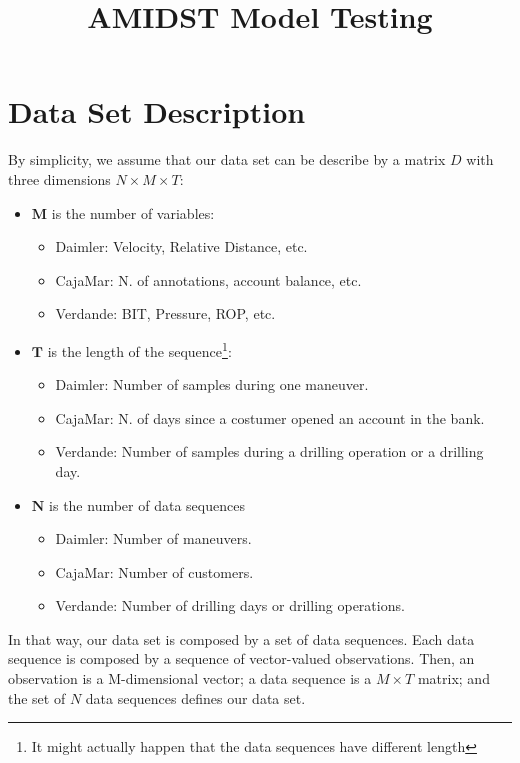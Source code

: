 \documentclass[12pt,a4paper,twopages]{article}
\title{AMIDST Model Testing}
\begin{document}
\maketitle

\section{Data Set Description}

By simplicity, we assume that our data set can be describe by a matrix $D$ with three dimensions $N\times M\times T$:

\begin{itemize}
\item $\mathbf{M}$ is the number of variables:
\begin{itemize}
\item Daimler: Velocity, Relative Distance, etc.
\item CajaMar: N. of annotations, account balance, etc.
\item Verdande: BIT, Pressure, ROP, etc.
\end{itemize}

\item $\mathbf{T}$ is the length of the sequence\footnote{It might actually happen that the data sequences have different length}:
\begin{itemize}
\item Daimler: Number of samples during one maneuver.
\item CajaMar: N. of days since a costumer opened an account in the bank. 
\item Verdande: Number of samples during a drilling operation or a drilling day.
\end{itemize}

\item $\mathbf{N}$ is the number of data sequences

\begin{itemize}
\item Daimler: Number of maneuvers.
\item CajaMar: Number of customers.
\item Verdande: Number of drilling days or drilling operations.
\end{itemize}
\end{itemize}

In that way, our data set is composed by a set of data sequences. Each data sequence 
is composed by a sequence of vector-valued observations. Then, an observation is a M-dimensional vector; a data sequence is a $M\times T$ matrix; and the set of $N$ data sequences defines our data set. 
\end{document}
